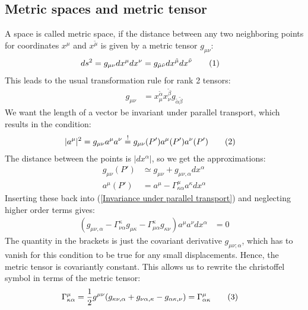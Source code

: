 \documentclass[a4paper,12pt]{article}
\newcommand\numberthis{\addtocounter{equation}{1}\tag{\theequation}}
\begin{document}
\subsection{Metric spaces and metric tensor}
A space is called metric space, if the distance between any two neighboring points for coordinates $x^\mu$ and $x^{\tilde{\mu}}$ is given by a metric tensor $g_{\mu\nu}$:
\begin{align*}
ds^2&=g_{\mu\nu}dx^\mu dx^\nu=g_{\tilde{\mu}\tilde{\nu}}dx^{\tilde{\mu}}dx^{\tilde{\nu}}\numberthis\label{Metric tensor definition}
\end{align*}
This leads to the usual transformation rule for rank 2 tensors:
\begin{align*}
g_{\mu\nu}&=x^{\tilde{\alpha}}_\mu x^{\tilde{\beta}}_\nu g_{\tilde{\alpha}\tilde{\beta}}
\end{align*}
We want the length of a vector be invariant under parallel transport, which results in the condition:
\begin{align*}
|a^\mu|^2&=g_{\mu\nu}a^\mu a^\nu\overset{!}{=}g_{\mu\nu}(P')a^{\mu}(P')a^{\nu}(P')\numberthis\label{Invariance under parallel transport}
\end{align*}
The distance between the points is $|dx^\alpha|$, so we get the approximations:
\begin{align*}
g_{\mu\nu}(P')&\simeq g_{\mu\nu}+g_{\mu\nu,\alpha}dx^\alpha\\
a^\mu(P')&=a^\mu -\Gamma^\mu_{\kappa\alpha}a^\kappa dx^\alpha
\end{align*}
Inserting these back into (\ref{Invariance under parallel transport}) and neglecting higher order terms gives:
\begin{align*}
(g_{\mu\nu,\alpha} -\Gamma^\kappa_{\nu\alpha}g_{\mu\kappa}-\Gamma^\kappa_{\mu\alpha}g_{\kappa\nu})a^\mu a^\nu dx^\alpha &=0
\end{align*}
The quantity in the brackets is just the covariant derivative $g_{\mu\nu;\alpha}$, which has to vanish for this condition to be true for any small displacements. Hence, the metric tensor is covariantly constant. This allows us to rewrite the christoffel symbol in terms of the metric tensor:
\begin{align*}
\Gamma^\mu_{\kappa\alpha}&=\frac{1}{2}g^{\mu\nu}(g_{\kappa\nu,\alpha}+g_{\nu\alpha,\kappa}-g_{\alpha\kappa,\nu})=\Gamma^\mu_{\alpha\kappa}\numberthis\label{Christoffel symbol with metric tensor}
\end{align*}
\end{document}
